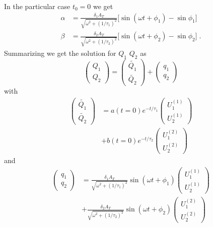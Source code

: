 \documentclass[pre,a4paper,twocolumn,superscriptaddress,%
floatfix]{revtex4}
\begin{document}
In the particular case $t_0 = 0$ we get
\begin{align}
  \label{eq:solalphabeta}
  \alpha &= \frac{ \delta_1 A_T}{\sqrt{\omega^2 + (1/\tau_1)^2}}
  \big[ \sin (\omega t + \phi_1) - \sin \phi_1 \big]
  \nonumber \\
  \beta &= \frac{ \delta_2 A_T}{\sqrt{\omega^2 + (1/\tau_2)^2}} 
  \big[ \sin (\omega t + \phi_2) - \sin \phi_2 \big]
          \; .           
\end{align}
Summarizing we get the solution for $Q_1$ $Q_2$ as
\begin{equation}
  \label{eq:sol1Q12}
  \left( \begin{array}{c} Q_1 \\ Q_2 \end{array} \right)  =
  \left( \begin{array}{c} \widetilde{Q_1} \\ \widetilde{Q_2} \end{array}
  \right)  + 
  \left( \begin{array}{c} q_1 \\ q_2 \end{array} \right)
\end{equation}
with
\begin{align}
  \label{eq:solutionQtilde}
\left( \begin{array}{c} \widetilde{Q_1} \\ \widetilde{Q_2} \end{array} \right)
  & = 
a(t=0) e^{-t / \tau_1}  \left( \begin{array}{c} U_1^{(1)} \\
                                 U_2^{(1)} \end{array} \right) 
\nonumber \\
  & + b(t=0) e^{-t / \tau_2}  \left( \begin{array}{c} U_1^{(2)} \\
                                   U_2^{(2)} \end{array} \right)
\end{align}
and
\begin{align}
  \label{eq:solutionqsmall}
  \left( \begin{array}{c} q_1 \\ q_2 \end{array} \right) &=
  \frac{ \delta_1 A_T}{\sqrt{\omega^2 + (1/\tau_1)^2}}
  \sin (\omega t + \phi_1)
\left( \begin{array}{c} U_1^{(1)} \\
                                 U_2^{(1)} \end{array} \right)
\nonumber \\
  & + \frac{ \delta_2 A_T}{\sqrt{\omega^2 + (1/\tau_2)^2}}
  \sin (\omega t + \phi_2)
 \left( \begin{array}{c} U_1^{(2)} \\
                                   U_2^{(2)} \end{array} \right)
\end{align}
\end{document}
